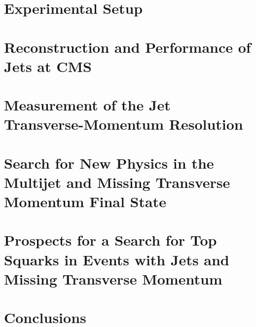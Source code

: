 \documentclass[
twoside=true,
headsepline,     %
headings=normal,
open=right,
numbers=noenddot, %
a4paper
]{scrreprt} %
\begin{document}
\chapter{Experimental Setup} \label{sec:Detector}
%

\chapter{Reconstruction and Performance of Jets at CMS} \label{sec:Jets}
%

\chapter{Measurement of the Jet Transverse-Momentum Resolution} \label{sec:Resolution}
%

\chapter[Search for New Physics with Jets and Missing Transverse Momentum]{Search for New Physics in the Multijet and Missing Transverse Momentum Final State} \label{sec:RA2}
%

\chapter[Prospects for a Search for Top Squarks]{Prospects for a Search for Top Squarks in Events with Jets and Missing Transverse Momentum} \label{sec:Stop}
%


\chapter{Conclusions} \label{sec:Conclusion}
%


\appendix
%





\cleardoublepage
\thispagestyle{empty}
\chapter*{~}
%
\end{document}
